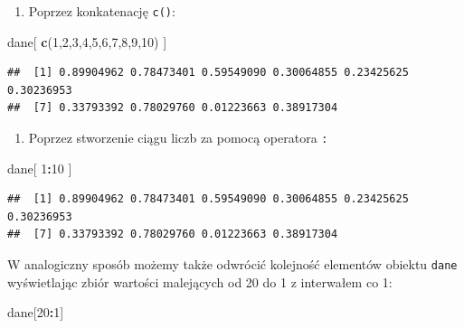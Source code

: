 \documentclass[]{book}
\newenvironment{Shaded}{\begin{snugshade}}{\end{snugshade}}
\newcommand{\KeywordTok}[1]{\textcolor[rgb]{0.13,0.29,0.53}{\textbf{#1}}}
\newcommand{\DecValTok}[1]{\textcolor[rgb]{0.00,0.00,0.81}{#1}}
\newcommand{\OperatorTok}[1]{\textcolor[rgb]{0.81,0.36,0.00}{\textbf{#1}}}
\newcommand{\NormalTok}[1]{#1}
\providecommand{\tightlist}{%
  \setlength{\itemsep}{0pt}\setlength{\parskip}{0pt}}
\theoremstyle{definition}
\theoremstyle{definition}
\theoremstyle{definition}
\theoremstyle{remark}
\begin{document}
\begin{enumerate}
\def\labelenumi{\arabic{enumi}.}
\tightlist
\item
  Poprzez konkatenację \texttt{c()}:
\end{enumerate}

\begin{Shaded}
\begin{Highlighting}[]
\NormalTok{dane[ }\KeywordTok{c}\NormalTok{(}\DecValTok{1}\NormalTok{,}\DecValTok{2}\NormalTok{,}\DecValTok{3}\NormalTok{,}\DecValTok{4}\NormalTok{,}\DecValTok{5}\NormalTok{,}\DecValTok{6}\NormalTok{,}\DecValTok{7}\NormalTok{,}\DecValTok{8}\NormalTok{,}\DecValTok{9}\NormalTok{,}\DecValTok{10}\NormalTok{) ]}
\end{Highlighting}
\end{Shaded}

\begin{verbatim}
##  [1] 0.89904962 0.78473401 0.59549090 0.30064855 0.23425625 0.30236953
##  [7] 0.33793392 0.78029760 0.01223663 0.38917304
\end{verbatim}

\begin{enumerate}
\def\labelenumi{\arabic{enumi}.}
\setcounter{enumi}{1}
\tightlist
\item
  Poprzez stworzenie ciągu liczb za pomocą operatora \texttt{:}
\end{enumerate}

\begin{Shaded}
\begin{Highlighting}[]
\NormalTok{dane[ }\DecValTok{1}\OperatorTok{:}\DecValTok{10}\NormalTok{ ]}
\end{Highlighting}
\end{Shaded}

\begin{verbatim}
##  [1] 0.89904962 0.78473401 0.59549090 0.30064855 0.23425625 0.30236953
##  [7] 0.33793392 0.78029760 0.01223663 0.38917304
\end{verbatim}

W analogiczny sposób możemy także odwrócić kolejność elementów obiektu
\texttt{dane} wyświetlając zbiór wartości malejących od 20 do 1 z
interwałem co 1:

\begin{Shaded}
\begin{Highlighting}[]
\NormalTok{dane[}\DecValTok{20}\OperatorTok{:}\DecValTok{1}\NormalTok{]}
\end{Highlighting}
\end{Shaded}
\end{document}
